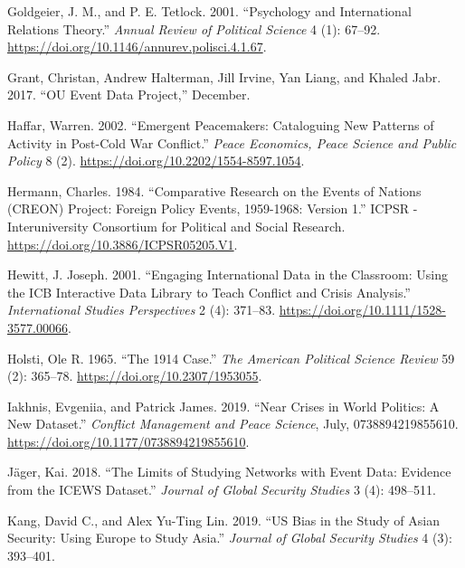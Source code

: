 \documentclass{article}
\newlength{\cslhangindent}
\newlength{\cslentryspacingunit} %
\newenvironment{CSLReferences}[2] %
 {%
  \setlength{\parindent}{0pt}
  \ifodd #1
  \let\oldpar\par
  \def\par{\hangindent=\cslhangindent\oldpar}
  \fi
  \setlength{\parskip}{#2\cslentryspacingunit}
 }%
 {}
\begin{document}
\begin{CSLReferences}{1}{0}
\leavevmode{}%
Goldgeier, J. M., and P. E. Tetlock. 2001. {``Psychology and
{International Relations Theory}.''} \emph{Annual Review of Political
Science} 4 (1): 67--92.
\url{https://doi.org/10.1146/annurev.polisci.4.1.67}.

\leavevmode{}%
Grant, Christan, Andrew Halterman, Jill Irvine, Yan Liang, and Khaled
Jabr. 2017. {``{OU Event Data Project},''} December.

\leavevmode{}%
Haffar, Warren. 2002. {``Emergent {Peacemakers}: {Cataloguing New
Patterns} of {Activity} in {Post-Cold War Conflict}.''} \emph{Peace
Economics, Peace Science and Public Policy} 8 (2).
\url{https://doi.org/10.2202/1554-8597.1054}.

\leavevmode{}%
Hermann, Charles. 1984. {``Comparative {Research} on the {Events} of
{Nations} ({CREON}) {Project}: {Foreign Policy Events}, 1959-1968:
{Version} 1.''} {ICPSR - Interuniversity Consortium for Political and
Social Research}. \url{https://doi.org/10.3886/ICPSR05205.V1}.

\leavevmode{}%
Hewitt, J. Joseph. 2001. {``Engaging {International Data} in the
{Classroom}: {Using} the {ICB Interactive Data Library} to {Teach
Conflict} and {Crisis Analysis}.''} \emph{International Studies
Perspectives} 2 (4): 371--83.
\url{https://doi.org/10.1111/1528-3577.00066}.

\leavevmode{}%
Holsti, Ole R. 1965. {``The 1914 {Case}.''} \emph{The American Political
Science Review} 59 (2): 365--78. \url{https://doi.org/10.2307/1953055}.

\leavevmode{}%
Iakhnis, Evgeniia, and Patrick James. 2019. {``Near Crises in World
Politics: {A} New Dataset.''} \emph{Conflict Management and Peace
Science}, July, 0738894219855610.
\url{https://doi.org/10.1177/0738894219855610}.

\leavevmode{}%
Jäger, Kai. 2018. {``The {Limits} of {Studying Networks} with {Event
Data}: {Evidence} from the {ICEWS Dataset}.''} \emph{Journal of Global
Security Studies} 3 (4): 498--511.

\leavevmode{}%
Kang, David C., and Alex Yu-Ting Lin. 2019. {``{US} Bias in the Study of
{Asian} Security: {Using Europe} to Study {Asia}.''} \emph{Journal of
Global Security Studies} 4 (3): 393--401.


\end{CSLReferences}
\end{document}
